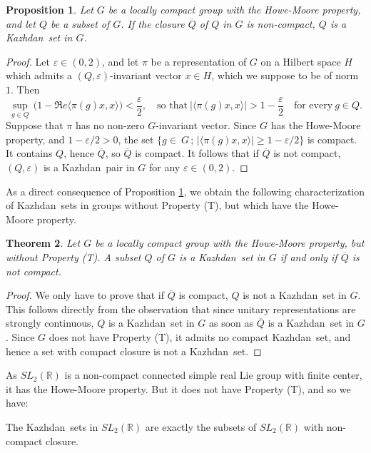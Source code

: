 \documentclass[11pt,english,a4paper]{smfart}
\numberwithin{equation}{section}
\newtheorem{theorem}{Theorem}[section]
\newtheorem{proposition}[theorem]{Proposition}
\theoremstyle{definition}
\begin{document}
\begin{proposition}\label{Proposition H}
 Let $G$ be a locally compact group with the Howe-Moore property, and let ${Q}$ be a subset of $G$. If the closure ${\overline{Q}}$ of ${Q}$ in $G$ is non-compact, ${Q}$ is a {Kazhdan}\ set in $G$.
\end{proposition}
\begin{proof}
 Let $\varepsilon \in(0,2)$, and let $\pi $ be a representation of $G$ on a Hilbert space $H$ which admits a $({Q},\varepsilon )$-invariant vector $x\in H$, which we suppose to be of norm $1$. Then 
\[
\sup_{g\in{Q}}\,\bigl(1-\Re e {\ensuremath{{\langle {\pi (g)x},{x}\rangle}}}\bigr)<\dfrac{\varepsilon }{2}, \quad\textrm{so that}\
\bigl|{\ensuremath{{\langle {\pi (g)x},{x}\rangle}}}\bigr|>1-\dfrac{\varepsilon }{2}\quad \textrm{for every}\ g\in{Q}.
\]
Suppose that $\pi $ has no non-zero $G$-invariant vector. Since $G$ has the Howe-Moore property, and $1-\varepsilon /2>0$, the set $\{g\in\ G\,;\,\bigl|{\ensuremath{{\langle {\pi (g)x},{x}\rangle}}}\bigr|\ge 1-\varepsilon /2\}$ is compact. It contains ${Q}$, hence ${\overline{Q}}$, so ${\overline{Q}}$ is compact. It follows that if ${\overline{Q}}$ is not compact, $({Q},\varepsilon )$ is a {Kazhdan}\ pair in $G$ for any $\varepsilon \in(0,2)$.
\end{proof}
As a direct consequence of Proposition \ref{Proposition H}, we obtain the following characterization of {Kazhdan}\ sets in groups without Property (T), but which have the Howe-Moore property.
\begin{theorem}\label{Proposition I}
 Let $G$ be a locally compact group with the Howe-Moore property, but without Property (T). A subset ${Q}$ of $G$ is a {Kazhdan}\ set in $G$ if and only if ${\overline{Q}}$ is not compact.
\end{theorem}

\begin{proof}
 We only have to prove that if ${\overline{Q}}$ is compact, ${Q}$ is not a {Kazhdan}\ set in $G$. This follows directly from the observation that since unitary representations are strongly continuous,  ${Q}$ is a {Kazhdan}\ set in $G$ as soon as  ${\overline{Q}}$ is a {Kazhdan}\ set in $G$. Since $G$ does not have Property (T), it admits no compact {Kazhdan}\ set, and hence a set with compact closure is not a {Kazhdan}\ set.
\end{proof}
As $SL_{2}({\ensuremath{\mathbb R}})$ is a non-compact connected simple real Lie group with finite center, it has the Howe-Moore property. But it does not have Property (T), and so we have:
\begin{example}\label{Example J}
 The {Kazhdan}\ sets in $SL_{2}({\ensuremath{\mathbb R}})$ are exactly the subsets of $SL_{2}({\ensuremath{\mathbb R}})$ with non-compact closure.
 \end{example}
\end{document}
